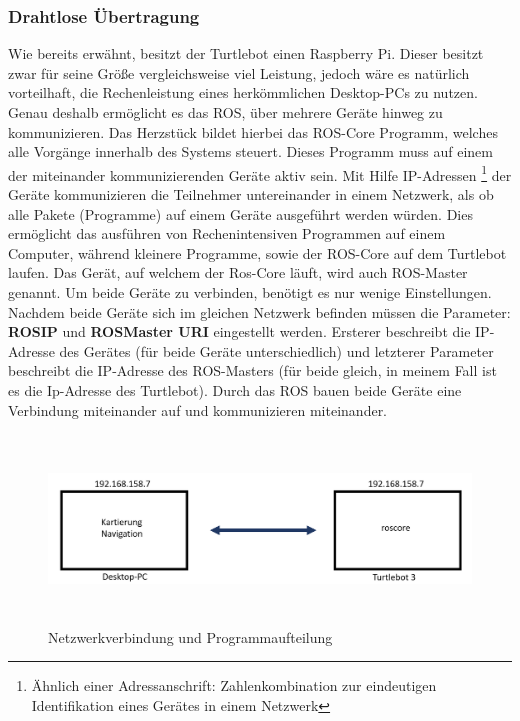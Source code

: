 {{		\subsubsection{Drahtlose Übertragung}
		{ Wie bereits erwähnt, besitzt der Turtlebot einen Raspberry Pi. Dieser besitzt zwar für seine Größe vergleichsweise viel Leistung, jedoch wäre es natürlich vorteilhaft, die Rechenleistung eines herkömmlichen Desktop-PCs zu nutzen. Genau deshalb ermöglicht es das ROS, über mehrere Geräte hinweg zu kommunizieren. Das Herzstück bildet hierbei das ROS-Core Programm, welches alle Vorgänge innerhalb des Systems steuert. Dieses Programm muss auf einem der miteinander kommunizierenden Geräte aktiv sein. Mit Hilfe IP-Adressen \footnote{Ähnlich einer Adressanschrift: Zahlenkombination zur eindeutigen Identifikation eines Gerätes in einem Netzwerk} der Geräte kommunizieren die Teilnehmer untereinander in einem Netzwerk, als ob alle Pakete (Programme) auf einem Geräte ausgeführt werden würden. Dies ermöglicht das ausführen von Rechenintensiven Programmen auf einem Computer, während kleinere Programme, sowie der ROS-Core auf dem Turtlebot laufen. Das Gerät, auf welchem der Ros-Core läuft, wird auch ROS-Master genannt. Um beide Geräte zu verbinden, benötigt es nur wenige Einstellungen. Nachdem beide Geräte sich im gleichen Netzwerk befinden müssen die Parameter: \textbf{ROS\textunderscore IP} und \textbf{ROS\textunderscore Master \textunderscore URI} eingestellt werden. Ersterer beschreibt die IP-Adresse des Gerätes (für beide Geräte unterschiedlich) und letzterer Parameter beschreibt die IP-Adresse des ROS-Masters (für beide gleich, in meinem Fall ist es die Ip-Adresse des Turtlebot). Durch das ROS bauen beide Geräte eine Verbindung miteinander auf und kommunizieren miteinander.
			
		\begin{figure}[H]
			\centering
			\includegraphics[height=5cm]{Bilder/network_turtlebot.png}
			\caption{Netzwerkverbindung und Programmaufteilung} 
			\label{pic:networkturtlebot}
		\end{figure}
		}
		
}}

